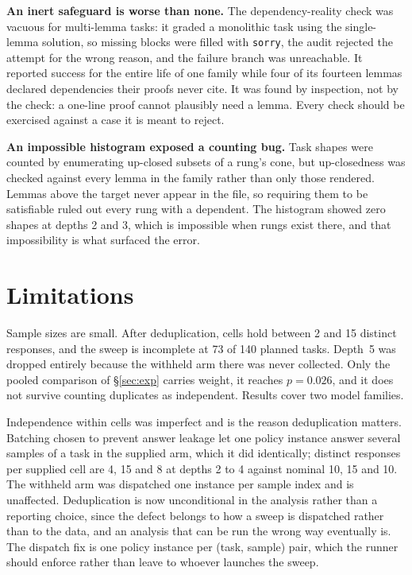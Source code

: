 \documentclass[10pt]{article}
\begin{document}
\textbf{An inert safeguard is worse than none.} The dependency-reality check was
vacuous for multi-lemma tasks: it graded a monolithic task using the
single-lemma solution, so missing blocks were filled with \texttt{sorry}, the
audit rejected the attempt for the wrong reason, and the failure branch was
unreachable. It reported success for the entire life of one family while four of
its fourteen lemmas declared dependencies their proofs never cite. It was found
by inspection, not by the check: a one-line proof cannot plausibly need a lemma.
Every check should be exercised against a case it is meant to reject.

\textbf{An impossible histogram exposed a counting bug.} Task shapes were
counted by enumerating up-closed subsets of a rung's cone, but up-closedness was
checked against every lemma in the family rather than only those rendered.
Lemmas above the target never appear in the file, so requiring them to be
satisfiable ruled out every rung with a dependent. The histogram showed zero
shapes at depths 2 and 3, which is impossible when rungs exist there, and that
impossibility is what surfaced the error.

\section{Limitations}

Sample sizes are small. After deduplication, cells hold between 2 and 15
distinct responses, and the sweep is incomplete at 73 of 140 planned tasks.
Depth~5 was dropped entirely because the withheld arm there was never collected.
Only the pooled comparison of \S\ref{sec:exp} carries weight, it reaches
$p=0.026$, and it does not survive counting duplicates as independent. Results
cover two model families.

Independence within cells was imperfect and is the reason deduplication matters.
Batching chosen to prevent answer leakage let one policy instance answer several
samples of a task in the supplied arm, which it did identically; distinct
responses per supplied cell are 4, 15 and 8 at depths 2 to 4 against nominal 10,
15 and 10. The withheld arm was dispatched one instance per sample index and is
unaffected. Deduplication is now unconditional in the analysis rather than a
reporting choice, since the defect belongs to how a sweep is dispatched rather
than to the data, and an analysis that can be run the wrong way eventually is.
The dispatch fix is one policy instance per (task, sample) pair, which the runner
should enforce rather than leave to whoever launches the sweep.
\end{document}
